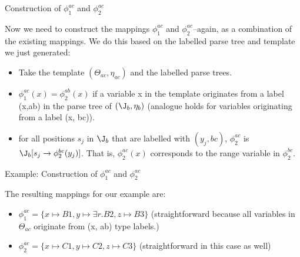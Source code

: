 \documentclass{beamer}
\begin{document}
\begin{frame}{Construction of $\phi^{ac}_{1}$ and $\phi^{ac}_{2}$}

\begin{figure}
\centering{
\scalebox{0.5}{}
}
\end{figure}

Now we need to construct the mappings  $\phi^{ac}_{1}$ and $\phi^{ac}_{2}$--again, as a combination of the existing mappings. We do this based on the labelled parse tree and template we just generated:

\begin{itemize}
\item Take the template $(\Theta_{ac}, \eta_{ac})$ and the labelled parse trees.
\item $\phi^{ac}_{1}(x) = \phi^{ab}_{2}(x)$ if a variable x in the template originates from a label (x,ab) in the parse tree of $(\J_{b}, \eta_{b})$ (analogue holds for variables originating from a label (x, bc)).
\item for all positions $s_{j}$ in $\J_{b}$ that are labelled with $(y_{j}, bc)$, $\phi^{ac}_{2}$ is $\J_{b} [s_{j} \rightarrow \phi^{bc}_{2}(y_{j})]$. That is, $\phi^{ac}_{2}(x)$ corresponds to the range variable in $\phi^{bc}_{2}$.
\end{itemize}

\end{frame}


\begin{frame}{Example: Construction of $\phi^{ac}_{1}$ and $\phi^{ac}_{2}$}

\begin{figure}
\centering{
\scalebox{0.5}{}
}
\end{figure}

The resulting mappings for our example are:

\begin{itemize}
\item $\phi^{ac}_{1} = \{ x \mapsto B1, y \mapsto \exists r.B2, z \mapsto B3 \}$ (straightforward because all variables in  $\Theta_{ac}$ originate from (x, ab) type labels.)
\item $\phi^{ac}_{2} = \{ x \mapsto C1, y \mapsto C2, z \mapsto C3 \}$ (straightforward in this case as well)
\end{itemize}

\end{frame}
\end{document}
